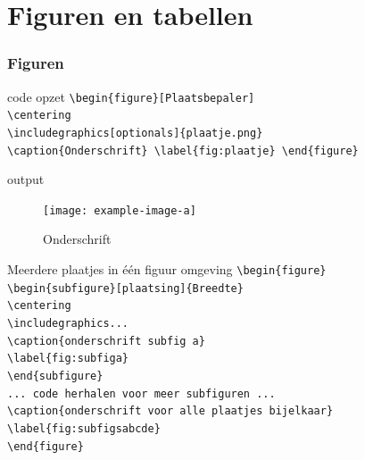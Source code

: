 \documentclass{beamer}
\begin{document}
\section{Figuren en tabellen}
\begin{frame}
	\frametitle{Figuren}
	\begin{block}{code opzet}
		\texttt{\textbackslash begin\{figure\}[Plaatsbepaler]\\
			\textbackslash centering\\
			\textbackslash includegraphics[optionals]\{plaatje.png\}\\
			\textbackslash caption\{Onderschrift\}
			\textbackslash label\{fig:plaatje\}
		\textbackslash end\{figure\}}
	\end{block}
	\begin{block}{output}
	{\begin{figure}
	\centering
    \texttt{[image: example-image-a]}
	\caption{Onderschrift}
	\label{fig:plaatje}
	\end{figure}}
	\end{block}
\end{frame}
\begin{frame}{Meerdere plaatjes in \'e\'en figuur omgeving}
	\texttt{\textbackslash begin\{figure\}\\
		\quad	\textbackslash begin\{subfigure\}[plaatsing]\{Breedte\}\\
			\qquad	\textbackslash centering\\
			\qquad	\textbackslash includegraphics...\\
			\qquad	\textbackslash caption\{onderschrift subfig a\}\\
			\qquad	\textbackslash label\{fig:subfiga\}\\
		\quad	\textbackslash end\{subfigure\}\\
		\quad	... code herhalen voor meer subfiguren ...\\
		\quad	\textbackslash caption\{onderschrift voor alle plaatjes bijelkaar\}\\
		\quad	\textbackslash label\{fig:subfigsabcde\}\\
		\textbackslash end\{figure\}
	}
\end{frame}
\end{document}
